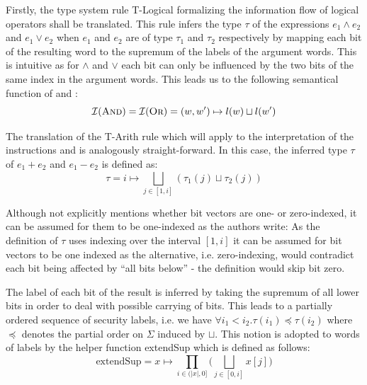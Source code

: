 Firstly, the type system rule T-Logical formalizing the information flow of logical operators shall be translated.
This rule infers the type $ \tau $ of the expressions $ e_1 \land e_2 $ and $ e_1 \lor e_2 $ when $ e_1 $ and $ e_2 $ are of type $ \tau_1 $ and $ \tau_2 $ respectively by mapping each bit of the resulting word to the supremum of the labels of the argument words.
This is intuitive as for $ \land $ and $ \lor $ each bit can only be influenced by the two bits of the same index in the argument words.
This leads us to the following semantical function of  and :
\begin{equation*}
    \mathcal{I}(\textsc{And}) = \mathcal{I}(\textsc{Or}) = (w, w') \mapsto l(w) \sqcup l(w')
\end{equation*}

The translation of the T-Arith rule which will apply to the interpretation of the instructions  and  is analogously straight-forward.
In this case, the inferred type $ \tau $ of $ e_1 + e_2 $ and $ e_1 - e_2 $ is defined as:
\begin{equation*}
    \tau = i \mapsto \bigsqcup_{j \in [1, i]} (\tau_1(j) \sqcup \tau_2(j))
\end{equation*}

Although \cite{Ferraiuolo17} not explicitly mentions whether bit vectors are one- or zero-indexed, it can be assumed for them to be one-indexed as the authors write: 
As the definition of $ \tau $ uses indexing over the interval $ [ 1, i ] $ it can be assumed for bit vectors to be one indexed as the alternative, i.e. zero-indexing, would contradict each bit being affected by \enquote{all bits below} - the definition would skip bit zero.

The label of each bit of the result is inferred by taking the supremum of all lower bits in order to deal with possible carrying of bits.
This leads to a partially ordered sequence of security labels, i.e. we have $ \forall i_1 < i_2. \tau(i_1) \preceq \tau(i_2) $ where $ \preceq $ denotes the partial order on $ \Sigma $ induced by $ \sqcup $.
This notion is adopted to words of labels by the helper function extendSup which is defined as follows:
\begin{equation*}
    \text{extendSup} = x \mapsto \prod_{i \in (|x|, 0]} \Big( \bigsqcup_{j \in [0, i]} x[j] \Big)
\end{equation*}

